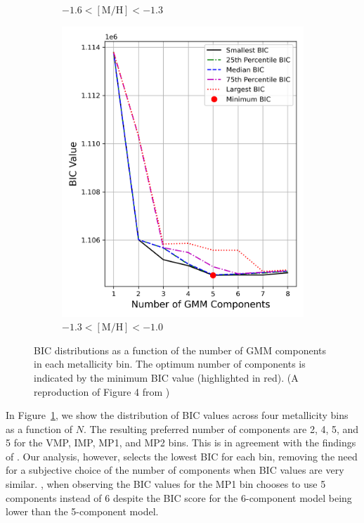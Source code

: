 \documentclass[a4paper,12pt]{article}
\begin{document}
\begin{figure}[h]
\begin{subfigure}[t]{0.23\textwidth}
        \caption{$-1.6 < \mathrm{[M/H]} < -1.3$}
    \end{subfigure}
    \hfill
    \begin{subfigure}[t]{0.23\textwidth}
        \centering
        \includegraphics[width=\linewidth]{../figures/bic_mp2.png}
        \caption{$-1.3 < \mathrm{[M/H]} < -1.0$}
    \end{subfigure}

    \caption{BIC distributions as a function of the number of GMM components in each metallicity bin. 
    The optimum number of components is indicated by the minimum BIC value (highlighted in red).
    (A reproduction of Figure 4 from \citet{zhang2024existencemetalpoordiscmilky})}
    \label{fig:bic_vs_n_components}
\end{figure}




In Figure~\ref{fig:bic_vs_n_components}, we show the distribution of BIC values across four metallicity bins as
a function of $N$. The resulting preferred number of components are 2, 4, 5, and 5 for the VMP, IMP, MP1, and MP2 bins.
This is in agreement with the findings of \citet{zhang2024existencemetalpoordiscmilky}.
Our analysis, however, selects the lowest BIC for each bin, removing the need for a subjective choice of the number of components
when BIC values are very similar. \citet{zhang2024existencemetalpoordiscmilky}, when observing the BIC values for the MP1 bin 
chooses to use 5 components instead of 6 despite the BIC score for the 6-component model being lower than the 5-component model.
\end{document}
